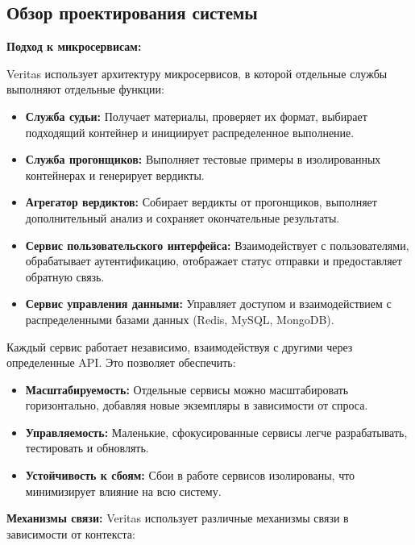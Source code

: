\subsection{Обзор проектирования системы}

\textbf{Подход к микросервисам:}
\noindent

Veritas использует архитектуру микросервисов, в которой отдельные службы выполняют отдельные функции:
\noindent
\begin{itemize}
    \itemsep 0em
    \item \textbf{Служба судьи:} \noindent Получает материалы, проверяет их формат, выбирает подходящий контейнер и инициирует распределенное выполнение.
    \item \textbf{Служба прогонщиков:} \noindent Выполняет тестовые примеры в изолированных контейнерах и генерирует вердикты.
    \item \textbf{Агрегатор вердиктов:} \noindent Собирает вердикты от прогонщиков, выполняет дополнительный анализ и сохраняет окончательные результаты.
    \item \textbf{Сервис пользовательского интерфейса:} \noindent Взаимодействует с пользователями, обрабатывает аутентификацию, отображает статус отправки и предоставляет обратную связь.
    \item \textbf{Сервис управления данными:} \noindent Управляет доступом и взаимодействием с распределенными базами данных (Redis, MySQL, MongoDB).
\end{itemize}

\noindent
Каждый сервис работает независимо, взаимодействуя с другими через определенные API. Это позволяет обеспечить:

\begin{itemize}
    \itemsep 0em
    \item \textbf{Масштабируемость:} \noindent Отдельные сервисы можно масштабировать горизонтально, добавляя новые экземпляры в зависимости от спроса.
    \item \textbf{Управляемость:} \noindent Маленькие, сфокусированные сервисы легче разрабатывать, тестировать и обновлять.
    \item \textbf{Устойчивость к сбоям:} \noindent Сбои в работе сервисов изолированы, что минимизирует влияние на всю систему.
\end{itemize}

\noindent
\textbf{Механизмы связи:} \noindent Veritas использует различные механизмы связи в зависимости от контекста:

